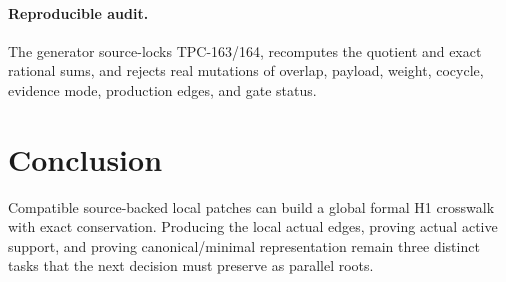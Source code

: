 \documentclass[11pt]{article}
\theoremstyle{definition}
\theoremstyle{remark}
\begin{document}
\paragraph{Reproducible audit.}
The generator source-locks TPC-163/164, recomputes the quotient and
exact rational sums, and rejects real mutations of overlap, payload,
weight, cocycle, evidence mode, production edges, and gate status.

\section{Conclusion}

Compatible source-backed local patches can build a global formal H1
crosswalk with exact conservation.  Producing the local actual edges,
proving actual active support, and proving canonical/minimal
representation remain three distinct tasks that the next decision
must preserve as parallel roots.


{\small}
\end{document}
